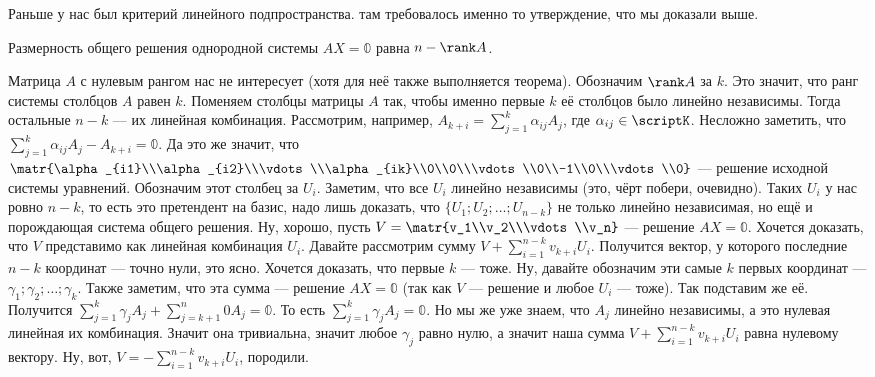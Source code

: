 \documentclass{article}
\begin{document}
\begin{itemize}
\begin{Proof}
            Раньше у нас был критерий линейного подпространства. там требовалось именно то утверждение, что мы доказали выше.
        \end{Proof}
        \thm Размерность общего решения однородной системы $AX=\mathbb0$ равна $n-\rank A$.
        \begin{Proof}
            Матрица $A$ с нулевым рангом нас не интересует (хотя для неё также выполняется теорема). Обозначим $\rank A$ за $k$. Это значит, что ранг системы столбцов $A$ равен $k$. Поменяем столбцы матрицы $A$ так, чтобы именно первые $k$ её столбцов было линейно независимы. Тогда остальные $n-k$ --- их линейная комбинация. Рассмотрим, например, $A_{k+i}=\sum\limits_{j=1}^k\alpha_{ij}A_j$, где $\alpha_{ij}\in\scriptK$. Несложно заметить, что $\sum\limits_{j=1}^k\alpha_{ij}A_j-A_{k+i}=\mathbb0$. Да это же значит, что $\matr{\alpha_{i1}\\\alpha_{i2}\\\vdots\\\alpha_{ik}\\0\\0\\\vdots\\0\\-1\\0\\\vdots\\0}$ --- решение исходной системы уравнений. Обозначим этот столбец за $U_i$. Заметим, что все $U_i$ линейно независимы (это, чёрт побери, очевидно). Таких $U_i$ у нас ровно $n-k$, то есть это претендент на базис, надо лишь доказать, что $\{U_1;U_2;\ldots;U_{n-k}\}$ не только линейно независимая, но ещё и порождающая система общего решения. Ну, хорошо, пусть $V=\matr{v_1\\v_2\\\vdots\\v_n}$ --- решение $AX=\mathbb0$. Хочется доказать, что $V$ представимо как линейная комбинация $U_i$. Давайте рассмотрим сумму $V+\sum\limits_{i=1}^{n-k}v_{k+i}U_i$. Получится вектор, у которого последние $n-k$ координат --- точно нули, это ясно. Хочется доказать, что первые $k$ --- тоже. Ну, давайте обозначим эти самые $k$ первых координат --- $\gamma_1;\gamma_2;\ldots;\gamma_k$. Также заметим, что эта сумма --- решение $AX=\mathbb0$ (так как $V$ --- решение и любое $U_i$ --- тоже). Так подставим же её. Получится $\sum\limits_{j=1}^k\gamma_jA_j+\sum\limits_{j=k+1}^n0A_{j}=\mathbb0$. То есть $\sum\limits_{j=1}^k\gamma_jA_j=\mathbb0$. Но мы же уже знаем, что $A_j$ линейно независимы, а это нулевая линейная их комбинация. Значит она тривиальна, значит любое $\gamma_j$ равно нулю, а значит наша сумма $V+\sum\limits_{i=1}^{n-k}v_{k+i}U_i$ равна нулевому вектору. Ну, вот, $V=-\sum\limits_{i=1}^{n-k}v_{k+i}U_i$, породили.\\

\end{Proof}
\end{itemize}
\end{document}
